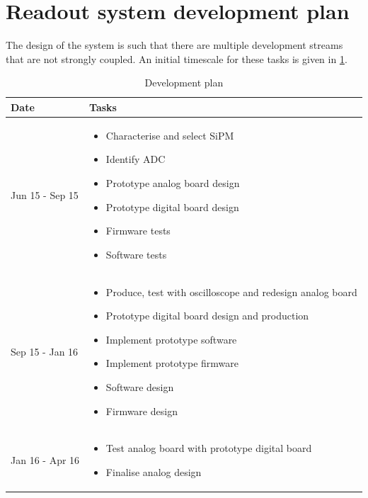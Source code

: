 \documentclass[a4paper]{article}
\begin{document}
\section{Readout system development plan}

The design of the system is such that there are multiple development streams that are not strongly coupled.
An initial timescale for these tasks is given in \cref{plan}.

\begin{table}[htp]
    \begin{center}
        \caption{Development plan}
        \label{plan}
        \begin{tabular}{p{}p{}}
            \hline
            \hline
            Date & Tasks \\
            \hline
            Jun 15 - Sep 15 & 
            \begin{itemize}
                \item Characterise and select SiPM
                \item Identify ADC
                \item Prototype analog board design
                \item Prototype digital board design
                \item Firmware tests
                \item Software tests
            \end{itemize}
            \\
            Sep 15 - Jan 16 & 
            \begin{itemize}
                \item Produce, test with oscilloscope and redesign analog board 
                \item Prototype digital board design and production
                \item Implement prototype software
                \item Implement prototype firmware
                \item Software design
                \item Firmware design
            \end{itemize}
            \\
            Jan 16 - Apr 16 & 
            \begin{itemize}
                \item Test analog board with prototype digital board
                \item Finalise analog design

\end{itemize}
\end{tabular}
\end{center}
\end{table}
\end{document}
